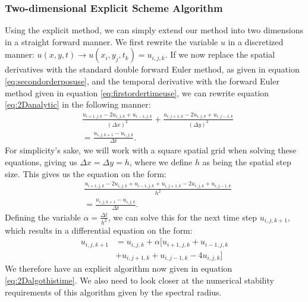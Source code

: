\documentclass[reprint,english,notitlepage]{revtex4-1}  %
\begin{document}
\subsubsection{Two-dimensional Explicit Scheme Algorithm}

Using the explicit method, we can simply extend our method into two dimensions in a straight forward manner. We first rewrite the variable $u$ in a discretized manner: $u(x,y,t) \rightarrow u(x_i,y_j,t_k) = u_{i,j,k}$. If we now replace the spatial derivatives with the standard double forward Euler method, as given in equation \ref{eq:secondorderposuse}, and the temporal derivative with the forward Euler method given in equation \ref{eq:firstordertimeuse}, we can rewrite equation \ref{eq:2Danalytic} in the following manner:
\begin{equation}
    \begin{split}
    &\frac{u_{i+1,j,k} - 2u_{i,j,k} + u_{i-1,j,k}}{(\Delta x)^2} + \frac{u_{i,j+1,k} - 2u_{i,j,k} + u_{i,j-1,k}}{(\Delta y)^2}\\ &= \frac{u_{i,j,k+1} - u_{i,j,k}}{\Delta t}.
    \end{split}
\end{equation}
For simplicity's sake, we will work with a square spatial grid when solving these equations, giving us $\Delta x = \Delta y = h$, where we define $h$ as being the spatial step size. This gives us the equation on the form:
\begin{equation}
    \begin{split}
    &\frac{u_{i+1,j,k} - 2u_{i,j,k} + u_{i-1,j,k} + u_{i,j+1,k} - 2u_{i,j,k} + u_{i,j-1,k}}{h^2}\\ &= \frac{u_{i,j,k+1} - u_{i,j,k}}{\Delta t}.
    \end{split}
\end{equation}
Defining the variable $\alpha = \frac{\Delta t}{h^2}$, we can solve this for the next time step $u_{i,j,k+1}$, which results in a differential equation on the form:
\begin{equation}\label{eq:2Dalgothistime}
    \begin{split}
    u_{i,j,k+1} &= u_{i,j,k} + \alpha\Big[ u_{i+1,j,k} + u_{i-1,j,k}\\ &+ u_{i,j+1,k} + u_{i,j-1,k} - 4u_{i,j,k} \Big]
    \end{split}
\end{equation}
We therefore have an explicit algorithm now given in equation \ref{eq:2Dalgothistime}. We also need to look closer at the numerical stability requirements of this algorithm given by the spectral radius.
\end{document}
